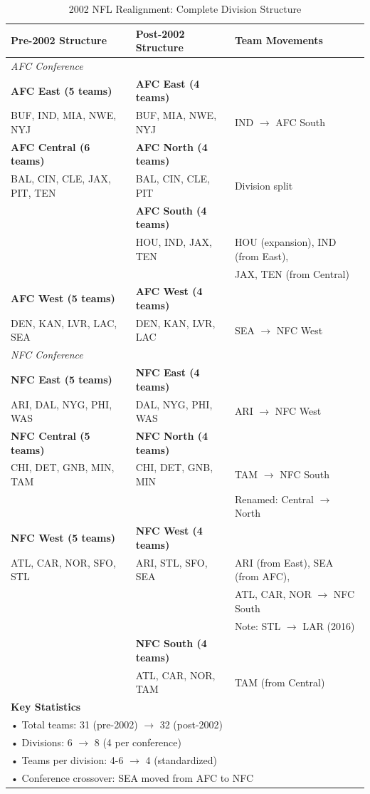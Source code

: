 \documentclass[a4paper,10.5pt,twoside]{article}
\begin{document}
\begin{table}[htbp]
\centering
\caption{2002 NFL Realignment: Complete Division Structure}
\label{tab:realignment_2002_detailed}
\begin{tabular}{p{5cm}p{5cm}p{3cm}}
\hline
\textbf{Pre-2002 Structure} & \textbf{Post-2002 Structure} & \textbf{Team Movements} \\
\hline
\multicolumn{3}{l}{\textit{AFC Conference}} \\
\hline
\textbf{AFC East (5 teams)} & \textbf{AFC East (4 teams)} & \\
BUF, IND, MIA, NWE, NYJ & BUF, MIA, NWE, NYJ & IND $\rightarrow$ AFC South \\
\hline
\textbf{AFC Central (6 teams)} & \textbf{AFC North (4 teams)} & \\
BAL, CIN, CLE, JAX, PIT, TEN & BAL, CIN, CLE, PIT & Division split \\
& \textbf{AFC South (4 teams)} & \\
& HOU, IND, JAX, TEN & HOU (expansion), IND (from East), \\
& & JAX, TEN (from Central) \\
\hline
\textbf{AFC West (5 teams)} & \textbf{AFC West (4 teams)} & \\
DEN, KAN, LVR, LAC, SEA & DEN, KAN, LVR, LAC & SEA $\rightarrow$ NFC West \\
\hline
\multicolumn{3}{l}{\textit{NFC Conference}} \\
\hline
\textbf{NFC East (5 teams)} & \textbf{NFC East (4 teams)} & \\
ARI, DAL, NYG, PHI, WAS & DAL, NYG, PHI, WAS & ARI $\rightarrow$ NFC West \\
\hline
\textbf{NFC Central (5 teams)} & \textbf{NFC North (4 teams)} & \\
CHI, DET, GNB, MIN, TAM & CHI, DET, GNB, MIN & TAM $\rightarrow$ NFC South \\
& & Renamed: Central $\rightarrow$ North \\
\hline
\textbf{NFC West (5 teams)} & \textbf{NFC West (4 teams)} & \\
ATL, CAR, NOR, SFO, STL & ARI, STL, SFO, SEA & ARI (from East), SEA (from AFC), \\
& & ATL, CAR, NOR $\rightarrow$ NFC South \\
& & Note: STL $\rightarrow$ LAR (2016) \\
& \textbf{NFC South (4 teams)} & \\
& ATL, CAR, NOR, TAM & TAM (from Central) \\
\hline
\multicolumn{3}{l}{\textbf{Key Statistics}} \\
\hline
\multicolumn{3}{l}{• Total teams: 31 (pre-2002) $\rightarrow$ 32 (post-2002)} \\
\multicolumn{3}{l}{• Divisions: 6 $\rightarrow$ 8 (4 per conference)} \\
\multicolumn{3}{l}{• Teams per division: 4-6 $\rightarrow$ 4 (standardized)} \\
\multicolumn{3}{l}{• Conference crossover: SEA moved from AFC to NFC} \\
\hline
\end{tabular}
\end{table}
\end{document}
